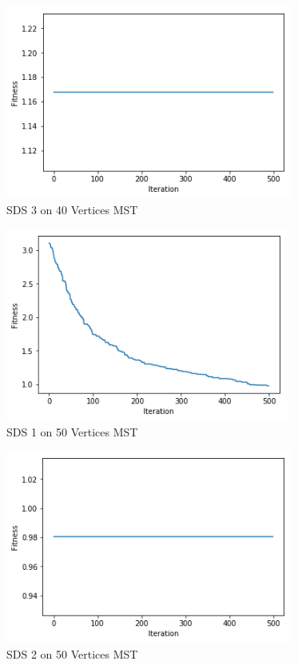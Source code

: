 \documentclass{AISB2008}
\begin{document}
{\begin{figure}
\centerline{\includegraphics[height=2.5in]{40MSTA3.png}}
\caption{SDS 3 on 40 Vertices MST}
\end{figure}


\begin{figure}
\centerline{\includegraphics[height=2.5in]{50MSTA1.png}}
\caption{SDS 1 on 50 Vertices MST}
\end{figure}

\begin{figure}
\centerline{\includegraphics[height=2.5in]{50MSTA2.png}}
\caption{SDS 2 on 50 Vertices MST}
\end{figure}

}
\end{document}
